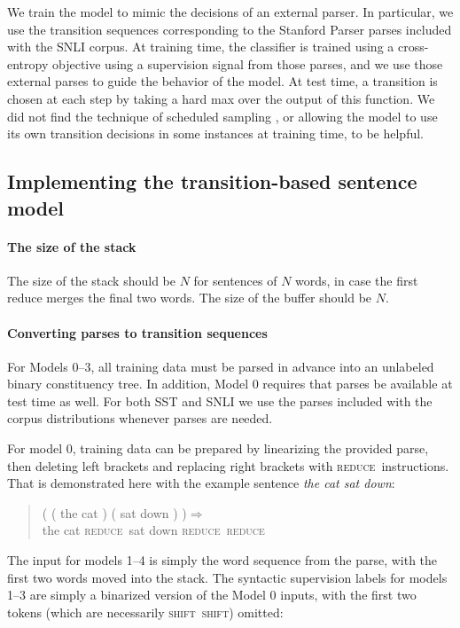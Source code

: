 \documentclass[11pt,letterpaper]{article}
\newcommand{\shift}{\textsc{shift}}
\newcommand{\reduce}{\textsc{reduce}}
\def\ii#1{\textit{#1}}
\begin{document}
We train the model to mimic the decisions of an external parser. In particular, we use the transition sequences corresponding to the Stanford Parser parses included with the SNLI corpus. At training time, the classifier is trained using a cross-entropy objective using a supervision signal from those parses, and we use those external parses to guide the behavior of the model. At test time, a transition is chosen at each step by taking a hard max over the output of this function. We did not find the technique of scheduled sampling \cite{bengio2015scheduled}, or allowing the model to use its own transition decisions in some instances at training time, to be helpful.

\subsection{Implementing the transition-based sentence model}

\paragraph{The size of the stack}
The size of the stack should be $N$ for sentences of $N$ words, in case the first reduce merges the final two words. The size of the buffer should be $N$.

\paragraph{Converting parses to transition sequences}

For Models 0--3, all training data must be parsed in advance into an unlabeled binary constituency tree. In addition, Model 0 requires that  parses be available at test time as well. For both SST and SNLI we use the parses included with the corpus distributions whenever parses are needed. 

For model 0, training data can be prepared by linearizing the provided parse, then deleting left brackets and replacing right brackets with \reduce~instructions. That is demonstrated here with the example sentence \ii{the cat sat down}:

\begin{quote}\small
( ( the cat ) ( sat down ) )$\Rightarrow$\\
the cat \reduce~sat down \reduce~\reduce
\end{quote}

The input for models 1--4 is simply the word sequence from the parse, with the first two words moved into the stack. The syntactic supervision labels for models 1--3 are simply a binarized version of the Model 0 inputs, with the first two tokens (which are necessarily \shift~\shift) omitted: 
\end{document}
